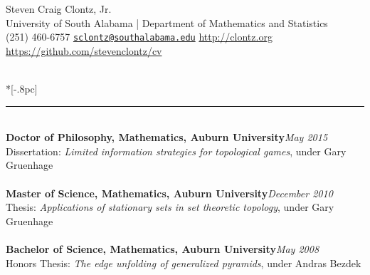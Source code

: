 \documentclass{article}
\newcommand{\headerText}[1]{
  \noindent{\large \bf #1} \\*[-.8pc]
  \rule{\textwidth}{.1pt}}
\begin{document}
\thispagestyle{empty}





\begin{center}
{\Large Steven Craig Clontz, Jr.} \\[.5pc]
University of South Alabama |
Department of Mathematics and Statistics \\
(251) 460-6757 \hspace{2em}
  \href{mailto:steven.clontz@gmail.com}{\nolinkurl{sclontz@southalabama.edu}}
  \hspace{2em}
  \url{http://clontz.org}\\
\url{https://github.com/stevenclontz/cv}
\end{center}


\vfill


\headerText{Education} \\
{\bf Doctor of Philosophy, Mathematics,
  Auburn University}\hfill {\it May 2015} \\
Dissertation:
  \textit{Limited information strategies for topological games},
  under Gary Gruenhage\\
\\
{\bf Master of Science, Mathematics,
  Auburn University}\hfill {\it December 2010} \\
Thesis:
  \textit{Applications of stationary sets in set theoretic topology},
  under Gary Gruenhage \\
\\
{\bf Bachelor of Science, Mathematics,
  Auburn University}\hfill {\it May 2008} \\
Honors Thesis:
  \textit{The edge unfolding of generalized pyramids},
  under Andras Bezdek \\


\vfill
\end{document}
